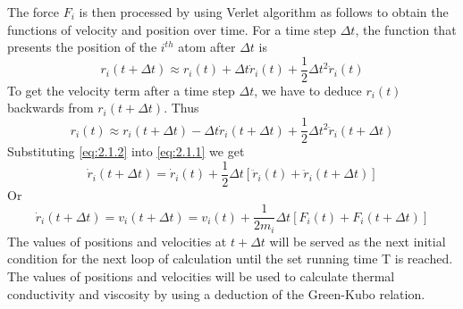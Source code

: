 The force $F_i$ is then processed by using Verlet algorithm as follows to obtain 
the functions of velocity and position over time. For a time step $\Delta t$, 
the function that presents the position of the $i^{th}$ atom after $\Delta t$ is
\begin{equation}
    r_{i}(t+\Delta t) \approx r_{i}(t)+\Delta t \dot{r}_{i}(t)+\frac{1}{2} \Delta t^{2} \ddot{r}_{i}(t)\label{eq:2.1.1}
\end{equation}
To get the velocity term after a time step $\Delta t$, we have to deduce $r_i(t)$ 
backwards from $r_i(t+\Delta t)$. Thus
\begin{equation}
    r_{i}(t) \approx r_{i}(t+\Delta t)-\Delta t \dot{r}_{i}(t+\Delta t)+\frac{1}{2} \Delta t^{2} \ddot{r}_{i}(t+\Delta t)\label{eq:2.1.2}
\end{equation}
Substituting \ref{eq:2.1.2} into \ref{eq:2.1.1} we get
\begin{equation}
    \dot{r}_{i}(t+\Delta t)=\dot{r}_{i}(t)+\frac{1}{2} \Delta t\left[\ddot{r}_{i}(t)+\ddot{r}_{i}(t+\Delta t)\right]
\end{equation}
Or
\begin{equation}
    \dot{r}_{i}(t+\Delta t)=v_{i}(t+\Delta t)=v_{i}(t)+\frac{1}{2 m_{i}} \Delta t\left[F_{i}(t)+F_{i}(t+\Delta t)\right]
\end{equation}
The values of positions and velocities at $t+\Delta t$ will be served as the next 
initial condition for the next loop of calculation until the set running time 
T is reached. The values of positions and velocities will be used to calculate 
thermal conductivity and viscosity by using a deduction of the Green-Kubo 
relation.